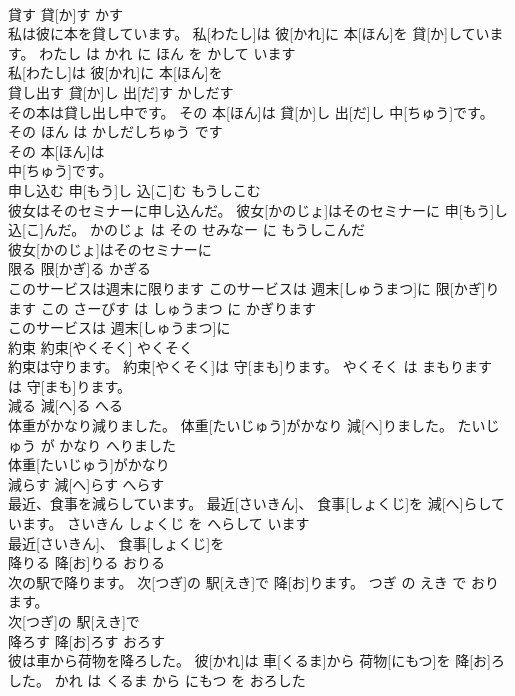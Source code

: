 \documentclass[8pt]{extreport}
\begin{document}
\begin{CJK}{UTF8}{min}
\\	貸す	貸[か]す	かす	
\\	私は彼に本を貸しています。	私[わたし]は 彼[かれ]に 本[ほん]を 貸[か]しています。	わたし は かれ に ほん を かして います	
\\	私[わたし]は 彼[かれ]に 本[ほん]を
\\	貸し出す	貸[か]し 出[だ]す	かしだす	
\\	その本は貸し出し中です。	その 本[ほん]は 貸[か]し 出[だ]し 中[ちゅう]です。	その ほん は かしだしちゅう です	
\\	その 本[ほん]は
\\	中[ちゅう]です。			
\\	申し込む	申[もう]し 込[こ]む	もうしこむ	
\\	彼女はそのセミナーに申し込んだ。	彼女[かのじょ]はそのセミナーに 申[もう]し 込[こ]んだ。	かのじょ は その せみなー に もうしこんだ	
\\	彼女[かのじょ]はそのセミナーに
\\	限る	限[かぎ]る	かぎる	
\\	このサービスは週末に限ります	このサービスは 週末[しゅうまつ]に 限[かぎ]ります	この さーびす は しゅうまつ に かぎります	
\\	このサービスは 週末[しゅうまつ]に
\\	約束	約束[やくそく]	やくそく	
\\	約束は守ります。	約束[やくそく]は 守[まも]ります。	やくそく は まもります	
\\	は 守[まも]ります。			
\\	減る	減[へ]る	へる	
\\	体重がかなり減りました。	体重[たいじゅう]がかなり 減[へ]りました。	たいじゅう が かなり へりました	
\\	体重[たいじゅう]がかなり
\\	減らす	減[へ]らす	へらす	
\\	最近、食事を減らしています。	最近[さいきん]、 食事[しょくじ]を 減[へ]らしています。	さいきん しょくじ を へらして います	
\\	最近[さいきん]、 食事[しょくじ]を
\\	降りる	降[お]りる	おりる	
\\	次の駅で降ります。	次[つぎ]の 駅[えき]で 降[お]ります。	つぎ の えき で おります。	
\\	次[つぎ]の 駅[えき]で
\\	降ろす	降[お]ろす	おろす	
\\	彼は車から荷物を降ろした。	彼[かれ]は 車[くるま]から 荷物[にもつ]を 降[お]ろした。	かれ は くるま から にもつ を おろした	

\end{CJK}
\end{document}
